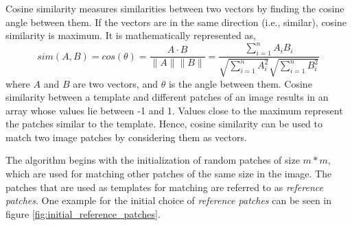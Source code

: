 \documentclass[fleqn,10pt]{wlscirep}
\begin{document}
	Cosine similarity  measures similarities between two vectors\cite{alake_understanding_2021} by finding the cosine angle between them. If the vectors are in the same direction (i.e., similar), cosine similarity is maximum. It is mathematically represented as,
	\begin{equation}
		sim(A,B) = cos(\theta) = \frac{A\cdot B}{\|A\|\|B\|} = \frac{\sum_{i=1}^{n}A_i B_i}{\sqrt{\sum_{i=1}^{n}A_i^2}\sqrt{\sum_{i=1}^{n}B_i^2}}
	\end{equation}
	where $A$ and $B$ are two vectors, and $\theta$ is the angle between them. Cosine similarity between a template and different patches of an image results in an array whose values lie between -1 and 1. Values close to the maximum represent the patches similar to the template.  Hence, cosine similarity can be used to match two image patches by considering them as vectors.
	
	
	
	


	The algorithm begins with the initialization of random patches of size $m*m$, which are used for matching other patches of the same size in the image. The patches that are used as templates for matching are referred to as \textit{reference patches}. One example for the initial choice of \textit{reference patches} can be seen in figure \ref{fig:initial_reference_patches}. 
	
	
	
	
\end{document}
